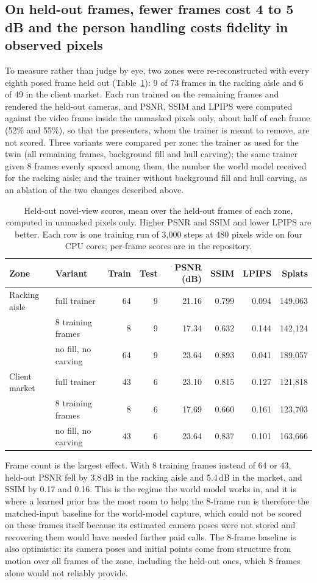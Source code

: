 \documentclass{article}
\begin{document}
\subsection{On held-out frames, fewer frames cost 4 to 5\,dB and the person handling costs fidelity in observed pixels}
To measure rather than judge by eye, two zones were re-reconstructed with
every eighth posed frame held out (Table~\ref{tab:heldout}): 9 of 73 frames in
the racking aisle and 6 of 49 in the client market. Each run trained on the
remaining frames and rendered the held-out cameras, and PSNR, SSIM and LPIPS
were computed against the video frame inside the unmasked pixels only, about
half of each frame (52\% and 55\%), so that the presenters, whom the trainer is
meant to remove, are not scored. Three variants were compared per zone: the
trainer as used for the twin (all remaining frames, background fill and hull
carving); the same trainer given 8 frames evenly spaced among them, the
number the world model received for the racking aisle; and the trainer
without background fill and hull carving, as an ablation of the two changes
described above.

\begin{table}[t]
\caption{Held-out novel-view scores, mean over the held-out frames of each
zone, computed in unmasked pixels only. Higher PSNR and SSIM and lower LPIPS
are better. Each row is one training run of 3{,}000 steps at 480 pixels wide on
four CPU cores; per-frame scores are in the repository.}
\centering\small
\begin{tabular}{@{}llrrrrrr@{}}
\toprule
Zone & Variant & Train & Test & PSNR (dB) & SSIM & LPIPS & Splats \\
\midrule
Racking aisle & full trainer & 64 & 9 & 21.16 & 0.799 & 0.094 & 149{,}063 \\
 & 8 training frames & 8 & 9 & 17.34 & 0.632 & 0.144 & 142{,}124 \\
 & no fill, no carving & 64 & 9 & 23.64 & 0.893 & 0.041 & 189{,}057 \\
\midrule
Client market & full trainer & 43 & 6 & 23.10 & 0.815 & 0.127 & 121{,}818 \\
 & 8 training frames & 8 & 6 & 17.69 & 0.660 & 0.161 & 123{,}703 \\
 & no fill, no carving & 43 & 6 & 23.64 & 0.837 & 0.101 & 163{,}666 \\
\bottomrule
\end{tabular}
\label{tab:heldout}
\end{table}

Frame count is the largest effect. With 8 training frames instead of 64 or 43,
held-out PSNR fell by 3.8\,dB in the racking aisle and 5.4\,dB in the market,
and SSIM by 0.17 and 0.16. This is the regime the world model works in, and it
is where a learned prior has the most room to help; the 8-frame run is
therefore the matched-input baseline for the world-model capture, which could
not be scored on these frames itself because its estimated camera poses were
not stored and recovering them would have needed further paid calls. The
8-frame baseline is also optimistic: its camera poses and initial points come
from structure from motion over all frames of the zone, including the held-out
ones, which 8 frames alone would not reliably provide.
\end{document}
